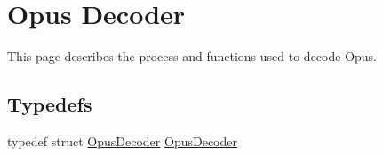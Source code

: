 \hypertarget{group__opus__decoder}{}\section{Opus Decoder}
\label{group__opus__decoder}


This page describes the process and functions used to decode Opus.  


\subsection*{Typedefs}
\begin{DoxyCompactItemize}
\item 
typedef struct \mbox{\hyperlink{group__opus__decoder_ga401d8579958d36094715a6b90cd159a6}{Opus\+Decoder}} \mbox{\hyperlink{group__opus__decoder_ga401d8579958d36094715a6b90cd159a6}{Opus\+Decoder}}
\end{DoxyCompactItemize}
